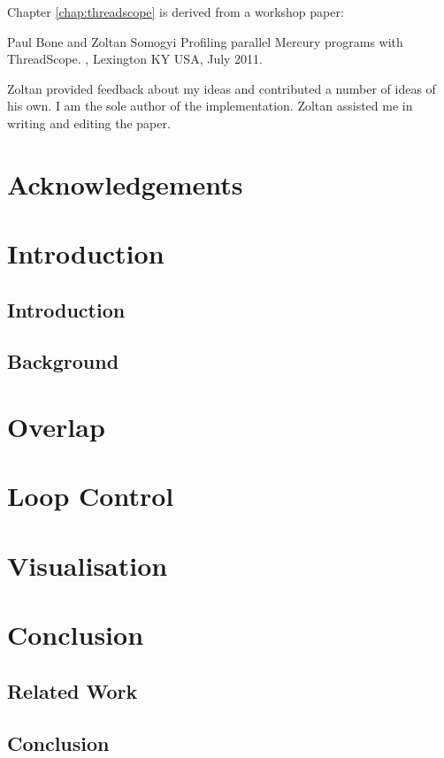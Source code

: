 \documentclass[a4paper,twoside]{report}
\begin{document}
Chapter \ref{chap:threadscope} is derived from a workshop paper:

Paul Bone and Zoltan Somogyi
\newblock Profiling parallel Mercury programs with ThreadScope.
,
Lexington KY USA, July 2011.

Zoltan provided feedback about my ideas and contributed a number of ideas of
his own.
I am the sole author of the implementation.
Zoltan assisted me in writing and editing the paper.

\chapter*{Acknowledgements}

\tableofcontents

\listoffigures

\listoftables

\chapter{Introduction}

\section{Introduction}

\section{Background}

\chapter{Overlap}
\label{ref:overlap}


\chapter{Loop Control}
\label{ref:loop_control}


\chapter{Visualisation}
\label{ref:tscope}


\chapter{Conclusion}

\section{Related Work}

\section{Conclusion}



\end{document}
